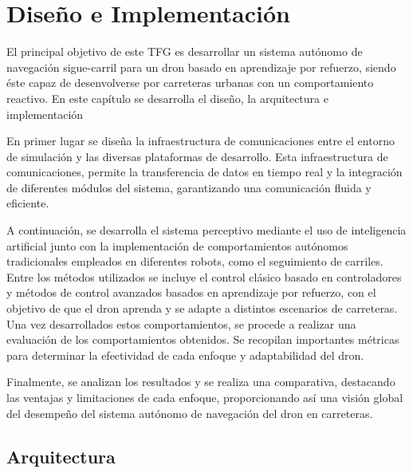 \chapter{Diseño e Implementación}
\label{cap:capitulo4}


\vspace{1cm}
El principal objetivo de este TFG es desarrollar un sistema autónomo de navegación sigue-carril para un dron basado en aprendizaje por refuerzo, siendo éste capaz de desenvolverse
por carreteras urbanas con un comportamiento reactivo.
En este capítulo se desarrolla el diseño, la arquitectura e implementación

En primer lugar se diseña la infraestructura de comunicaciones entre el entorno de simulación y las diversas 
plataformas de desarrollo. Esta 
infraestructura de comunicaciones, permite la transferencia de datos en tiempo real y la integración de diferentes módulos del sistema, garantizando 
una comunicación fluida y eficiente.

A continuación, se desarrolla el sistema perceptivo mediante el uso de inteligencia artificial junto con la implementación de comportamientos autónomos tradicionales empleados
 en diferentes robots, como el seguimiento de carriles. Entre los métodos utilizados se incluye 
el control clásico basado en controladores y métodos de control avanzados basados en aprendizaje por refuerzo, con el objetivo de que el dron aprenda y se 
adapte a distintos escenarios de carreteras. 
Una vez desarrollados estos comportamientos, se procede a realizar una evaluación de los comportamientos obtenidos. Se recopilan
importantes métricas para determinar la efectividad de cada enfoque y adaptabilidad del dron. 

Finalmente, se analizan los resultados y se realiza una comparativa, destacando las ventajas y limitaciones de cada enfoque, 
proporcionando así una visión global del desempeño del sistema autónomo 
de navegación del dron en carreteras.

\section{Arquitectura}
\label{sec:Arquitectura}

